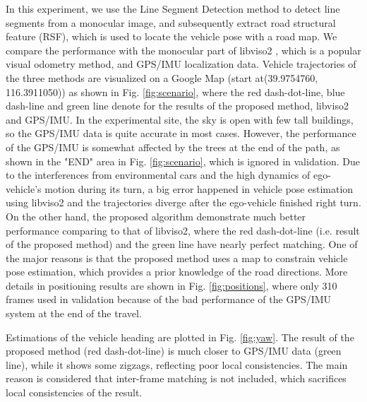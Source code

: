 \documentclass[letterpaper, 10 pt, conference]{ieeeconf}  %
\begin{document}
In this experiment, we use the Line Segment Detection method \cite{von2012lsd} to detect line segments from a monocular image, and subsequently extract road structural feature (RSF), which is used to locate the vehicle pose with a road map. We compare the performance with the monocular part of libviso2 \cite{Geiger11}\cite{Geiger2013Visual}, which is a popular visual odometry method, and GPS/IMU localization data. Vehicle trajectories of the three methods are visualized on a Google Map (start at(39.9754760, 116.3911050)) as shown in Fig. \ref{fig:scenario}, where the red dash-dot-line, blue dash-line and green line denote for the results of the proposed method, libviso2 and GPS/IMU. In the experimental site, the sky is open with few tall buildings, so the GPS/IMU data is quite accurate in most cases. However, the performance of the GPS/IMU is somewhat affected by the trees at the end of the path, as shown in the "END" area in Fig. \ref{fig:scenario}, which is ignored in validation. Due to the interferences from environmental cars and the high dynamics of ego-vehicle's motion during its turn, a big error happened in vehicle pose estimation using libviso2 and the trajectories diverge after the ego-vehicle finished right turn. On the other hand, the proposed algorithm demonstrate much better performance comparing to that of libviso2, where the red dash-dot-line (i.e. result of the proposed method) and the green line have nearly perfect matching. One of the major reasons is that the proposed method uses a map to constrain vehicle pose estimation, which provides a prior knowledge of the road directions. More details in positioning results are shown in Fig. \ref{fig:positions}, where only 310 frames used in validation because of the bad performance of the GPS/IMU system at the end of the travel.

Estimations of the vehicle heading are plotted in Fig. \ref{fig:yaw}. The result of the proposed method (red dash-dot-line) is much closer to GPS/IMU data (green line), while it shows some zigzags, reflecting poor local consistencies. The main reason is considered that inter-frame matching is not included, which sacrifices local consistencies of the result.


\end{document}
